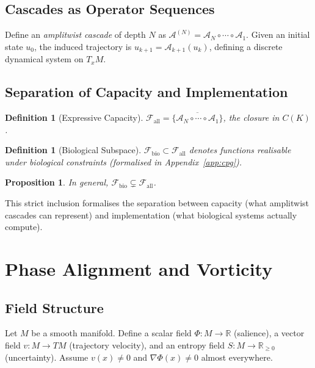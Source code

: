 \documentclass[12pt, a4paper]{article}
\newtheorem{definition}[theorem]{Definition}
\newtheorem{proposition}[theorem]{Proposition}
\theoremstyle{remark}
\theoremstyle{definition}
\begin{document}
\subsection{Cascades as Operator Sequences}

Define an \emph{amplitwist cascade} of depth $N$ as
$\mathcal{A}^{(N)} = \mathcal{A}_N \circ \cdots \circ \mathcal{A}_1$.
Given an initial state $u_0$, the induced trajectory is $u_{k+1} = \mathcal{A}_{k+1}(u_k)$,
defining a discrete dynamical system on $T_x M$.

\subsection{Separation of Capacity and Implementation}

\begin{definition}[Expressive Capacity]
$\mathcal{F}_{\mathrm{all}} = \overline{\{\mathcal{A}_N \circ \cdots \circ \mathcal{A}_1\}}$,
the closure in $C(K)$.
\end{definition}

\begin{definition}[Biological Subspace]
$\mathcal{F}_{\mathrm{bio}} \subset \mathcal{F}_{\mathrm{all}}$ denotes functions realisable
under biological constraints (formalised in Appendix~\ref{app:cpg}).
\end{definition}

\begin{proposition}
In general, $\mathcal{F}_{\mathrm{bio}} \subsetneq \mathcal{F}_{\mathrm{all}}$.
\end{proposition}

This strict inclusion formalises the separation between capacity (what amplitwist cascades
can represent) and implementation (what biological systems actually compute).

\section{Phase Alignment and Vorticity}
\label{app:phase}

\subsection{Field Structure}

Let $M$ be a smooth manifold.  Define a scalar field $\Phi \colon M \to \mathbb{R}$
(salience), a vector field $v \colon M \to TM$ (trajectory velocity), and an entropy
field $S \colon M \to \mathbb{R}_{\ge 0}$ (uncertainty).  Assume $v(x) \neq 0$ and
$\nabla\Phi(x) \neq 0$ almost everywhere.
\end{document}
